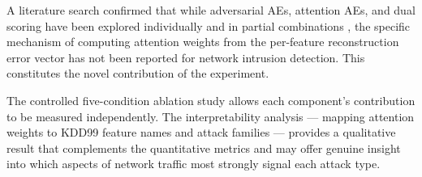 \documentclass[12pt,a4paper]{article}
\begin{document}
A literature search confirmed that while adversarial AEs, attention AEs, and
dual scoring have been explored individually and in partial combinations
\citep{alad,arcade,aladaen,wavelet_aae,vae_attention_lstm,attention_ae_latent},
the specific mechanism of computing attention weights from the per-feature
reconstruction error vector has not been reported for network intrusion
detection. This constitutes the novel contribution of the experiment.

The controlled five-condition ablation study allows each component's contribution
to be measured independently. The interpretability analysis --- mapping attention
weights to KDD99 feature names and attack families --- provides a qualitative
result that complements the quantitative metrics and may offer genuine insight
into which aspects of network traffic most strongly signal each attack type.


\end{document}
